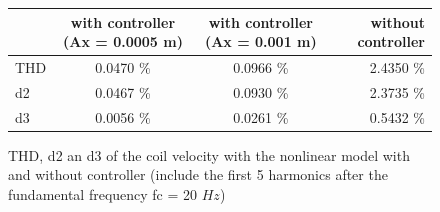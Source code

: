 \begin{figure}[H]
 \centering 
\begin{tabular}{|l|c|c|r|}
  \hline
   & with controller (Ax = 0.0005 m) & with controller (Ax = 0.001 m) & without controller \\
  \hline
  THD & 0.0470 \% & 0.0966 \% & 2.4350 \%\\
	\hline
  d2 & 0.0467 \%& 0.0930 \% & 2.3735 \%\\
	\hline
	d3 & 0.0056 \%& 0.0261 \% & 0.5432 \%\\
  \hline
\end{tabular}
\caption{THD, d2 an d3 of the coil velocity with the nonlinear model with and without controller (include the first 5 harmonics after the fundamental frequency fc = 20 $Hz$)}
	\label{fig:tabTHD}
	\end{figure}